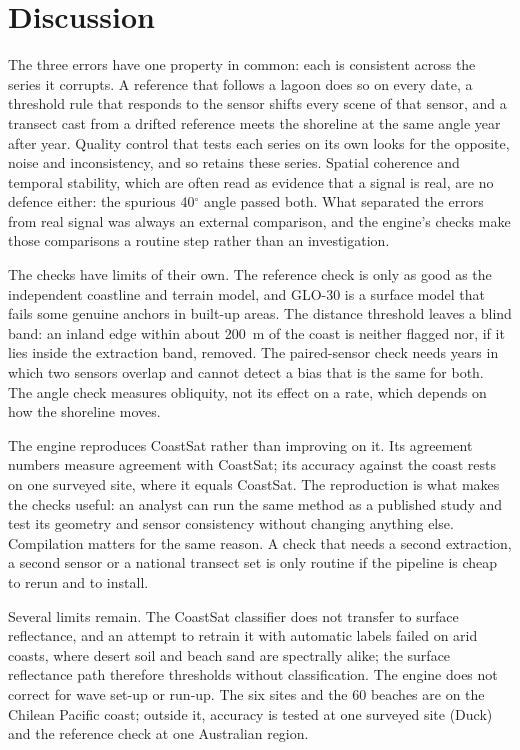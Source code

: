 \documentclass[authoryear,preprint,review,12pt]{elsarticle}
\begin{document}
\FloatBarrier
\section{Discussion}\label{sec:discussion}
The three errors have one property in common: each is consistent across the
series it corrupts. A reference that follows a lagoon does so on every date, a
threshold rule that responds to the sensor shifts every scene of that sensor,
and a transect cast from a drifted reference meets the shoreline at the same
angle year after year. Quality control that tests each series on its own looks
for the opposite, noise and inconsistency, and so retains these series. Spatial
coherence and temporal stability, which are often read as evidence that a
signal is real, are no defence either: the spurious 40$^\circ$ angle passed both.
What separated the errors from real signal was always an external comparison,
and the engine's checks make those comparisons a routine step rather than an
investigation.

The checks have limits of their own. The reference check is only as good as
the independent coastline and terrain model, and GLO-30 is a surface model that
fails some genuine anchors in built-up areas. The distance threshold leaves a
blind band: an inland edge within about 200~m of the coast is neither flagged
nor, if it lies inside the extraction band, removed. The paired-sensor check
needs years in which two sensors overlap and cannot detect a bias that is the
same for both. The angle check measures obliquity, not its effect on a rate,
which depends on how the shoreline moves.

The engine reproduces CoastSat rather than improving on it. Its agreement
numbers measure agreement with CoastSat; its accuracy against the coast rests
on one surveyed site, where it equals CoastSat. The reproduction is what makes the checks useful: an analyst can run the same
method as a published study and test its geometry and sensor consistency
without changing anything else. Compilation matters for the same reason. A
check that needs a second extraction, a second sensor or a national transect
set is only routine if the pipeline is cheap to rerun and to install.

Several limits remain. The CoastSat classifier does not transfer to surface
reflectance, and an attempt to retrain it with automatic labels failed on arid
coasts, where desert soil and beach sand are spectrally alike; the surface
reflectance path therefore thresholds without classification. The engine does
not correct for wave set-up or run-up. The six sites and the 60 beaches are on
the Chilean Pacific coast; outside it, accuracy is tested at one surveyed site
(Duck) and the reference check at one Australian region.
\end{document}
